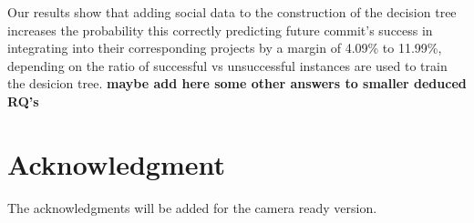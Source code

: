 \documentclass[10pt, conference]{IEEEtran}
\newcommand{\todo}[1]
  {{\scriptsize \textbf{\color{red} {#1}}}}
\begin{document}
Our results show that adding social data to the construction of the decision tree increases the probability this correctly predicting future commit's success in integrating into their corresponding projects by a margin of 4.09\% to 11.99\%, depending on the ratio of successful vs unsuccessful instances are used to train the desicion tree.
\todo{maybe add here some other answers to smaller deduced RQ's}


\section*{Acknowledgment}

The acknowledgments will be added for the camera ready version.




%
%
%






\end{document}
